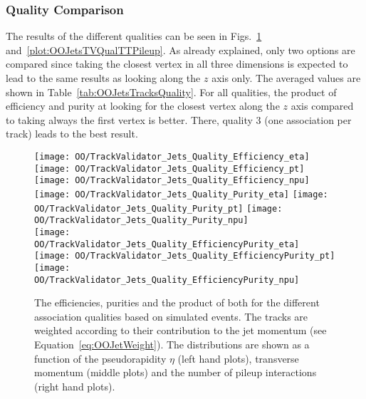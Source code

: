 \subsubsection{Quality Comparison \label{sec:OOJetsTracksQuality} }

The results of the different qualities can be seen in Figs.~\ref{plot:OOJetsTVQualTTSignal} and~\ref{plot:OOJetsTVQualTTPileup}. As already explained, only two options are compared since taking the closest vertex in all three dimensions is expected to lead to the same results as looking along the $z$ axis only. The averaged values are shown in Table~\ref{tab:OOJetsTracksQuality}. For all qualities, the product of efficiency and purity at looking for the closest vertex along the $z$ axis compared to taking always the first vertex is better. There, quality 3 (one association per track) leads to the best result.

\begin{figure}[h!t]
  \centering
  \texttt{[image: OO/TrackValidator\_Jets\_Quality\_Efficiency\_eta]}
  \texttt{[image: OO/TrackValidator\_Jets\_Quality\_Efficiency\_pt]}
  \texttt{[image: OO/TrackValidator\_Jets\_Quality\_Efficiency\_npu]}
  \\
  \texttt{[image: OO/TrackValidator\_Jets\_Quality\_Purity\_eta]}
  \texttt{[image: OO/TrackValidator\_Jets\_Quality\_Purity\_pt]}
  \texttt{[image: OO/TrackValidator\_Jets\_Quality\_Purity\_npu]}
  \\
  \texttt{[image: OO/TrackValidator\_Jets\_Quality\_EfficiencyPurity\_eta]}
  \texttt{[image: OO/TrackValidator\_Jets\_Quality\_EfficiencyPurity\_pt]}
  \texttt{[image: OO/TrackValidator\_Jets\_Quality\_EfficiencyPurity\_npu]}
  \caption[Efficiencies, purities and their product for the different qualities based on simulated \ttbar events with jet weight]{The efficiencies, purities and the product of both for the different association qualities based on simulated \ttbar events. The tracks are weighted according to their contribution to the jet momentum (see Equation~\ref{eq:OOJetWeight}). The distributions are shown as a function of the pseudorapidity $\eta$ (left hand plots), transverse momentum (middle plots) and the number of pileup interactions (right hand plots). \label{plot:OOJetsTVQualTTSignal}}
\end{figure}

